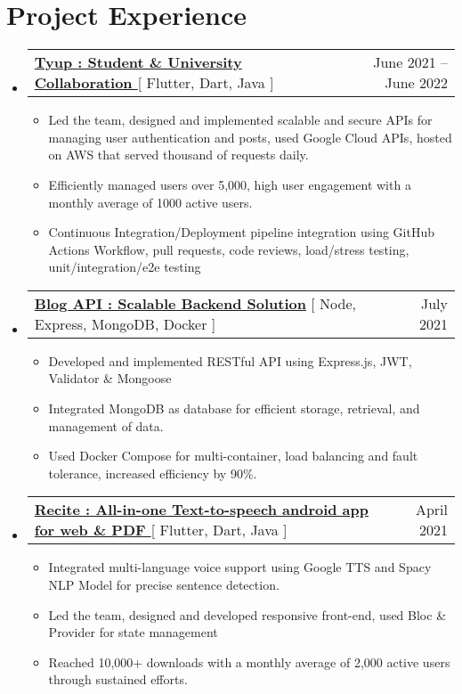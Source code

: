 \documentclass[letterpaper,11pt]{article}
\makeatletter
\newcommand{\resumeItem}[1]{
  \item\small{
    {#1 \vspace{-2pt}}
  }
}
\newcommand{\resumeProjectHeading}[2]{
    \item
    \begin{tabular*}{0.97\textwidth}{l@{\extracolsep{\fill}}r}
      \small#1 & #2 \\
    \end{tabular*}\vspace{-7pt}
}
\newcommand{\resumeSubHeadingListStart}{\begin{itemize}[leftmargin=0.15in, label={}]}
\newcommand{\resumeSubHeadingListEnd}{\end{itemize}}
\newcommand{\resumeItemListStart}{\begin{itemize}}
\newcommand{\resumeItemListEnd}{\end{itemize}\vspace{-5pt}}
\makeatother
\begin{document}




\section{Project Experience}
    
    \resumeSubHeadingListStart
      \resumeProjectHeading
          {\textbf{\href{https://play.google.com/store/apps/details?id=org.elitecaps.tyup}{Tyup : Student \& University Collaboration }}{[ Flutter, Dart, Java ]}}{June 2021 -- June 2022}
          \resumeItemListStart
           \resumeItem{Led the team, designed and implemented scalable and secure APIs for managing user authentication and posts, used Google Cloud APIs, hosted on AWS that served thousand of requests daily.}
           \resumeItem{Efficiently managed users over 5,000, high user engagement with a monthly average of 1000 active users.}
           \resumeItem{Continuous Integration/Deployment pipeline integration using GitHub Actions Workflow, pull requests, code reviews, load/stress testing, unit/integration/e2e testing}
          \resumeItemListEnd
    \resumeSubHeadingListEnd

    \resumeSubHeadingListStart
      \resumeProjectHeading
          {\textbf{\href{https://github.com/divshekhar/docker_node_api}{\textbf{Blog API : Scalable Backend Solution}}}{ [ Node, Express, MongoDB, Docker ]}}{July 2021}
          \resumeItemListStart
            \resumeItem{Developed and implemented RESTful API using Express.js, JWT, Validator \& Mongoose}
            \resumeItem{Integrated MongoDB as database for efficient storage, retrieval, and management of data.}
            \resumeItem{Used Docker Compose for multi-container, load balancing and fault tolerance, increased efficiency by 90\%.}
          \resumeItemListEnd
    \resumeSubHeadingListEnd

    \resumeSubHeadingListStart
      \resumeProjectHeading
          {\textbf{\href{https://play.google.com/store/apps/details?id=com.hackthedeveloper.recite}{Recite : All-in-one Text-to-speech android app for web \& PDF }}{[ Flutter, Dart, Java ]}}{April 2021}
          \resumeItemListStart
           \resumeItem{Integrated multi-language voice support using Google TTS and Spacy NLP Model for precise sentence detection.}
           \resumeItem{Led the team, designed and developed responsive front-end, used Bloc \& Provider for state management}
           \resumeItem{Reached 10,000+ downloads with a monthly average of 2,000 active users through sustained efforts.}
          \resumeItemListEnd
    \resumeSubHeadingListEnd
\end{document}
